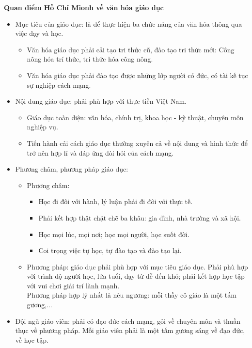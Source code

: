\documentclass{article}
\begin{document}
\begin{enumerate}
		\textbf{Quan điểm Hồ Chí Mionh về văn hóa giáo dục}
		\begin{itemize}
			\item Mục tiêu của giáo dục: là để thực hiện ba chức năng của văn hóa thông qua việc dạy và học.
			\begin{itemize}
				\item Văn hóa giáo dục phải cải tạo tri thức cũ, đào tạo tri thức mới: Công nông hóa trí thức, trí thức hóa công nông.
				\item Văn hóa giáo dục phải đào tạo được những lớp người có đức, có tài kế tục sự nghiệp cách mạng.
			\end{itemize}
			\item Nội dung giáo dục: phải phù hợp với thực tiễn Việt Nam.
			\begin{itemize}
				\item Giáo dục toàn diện: văn hóa, chính trị, khoa học - kỹ thuật, chuyên môn nghiệp vụ.
				\item Tiến hành cải cách giáo dục thường xuyên cả về nội dung và hình thức để trở nên hợp lí và đáp ứng đòi hỏi của cách mạng.
			\end{itemize}
			\item Phương châm, phương pháp giáo dục:
			\begin{itemize}
				\item Phương châm:
				\begin{itemize}
					\item Học đi đôi với hành, lý luận phải đi đôi với thực tế.
					\item Phải kết hợp thật chặt chẽ ba khâu: gia đình, nhà trường và xã hội.
					\item Học mọi lúc, mọi nơi; học mọi người, học suốt đời.
					\item Coi trọng việc tự học, tự đào tạo và đào tạo lại.
				\end{itemize}
				\item Phương pháp: giáo dục phải phù hợp với mục tiêu giáo dục. Phải phù hợp với trình độ người học, lứa tuổi, dạy từ dễ đến khó; phải kết hợp học tập với vui chơi giải trí lành mạnh.\\
				Phương pháp hợp lý nhất là nêu ngương: mỗi thầy cô giáo là một tấm gương,...
			\end{itemize}
			\item Đội ngũ giáo viên: phải có đạo đức cách mạng, gỏi về chuyên môn và thuần thục về phương pháp. Mỗi giáo viên phải là một tấm gương sáng về đạo đức, về học tập.
		\end{itemize}

\end{enumerate}
\end{document}

